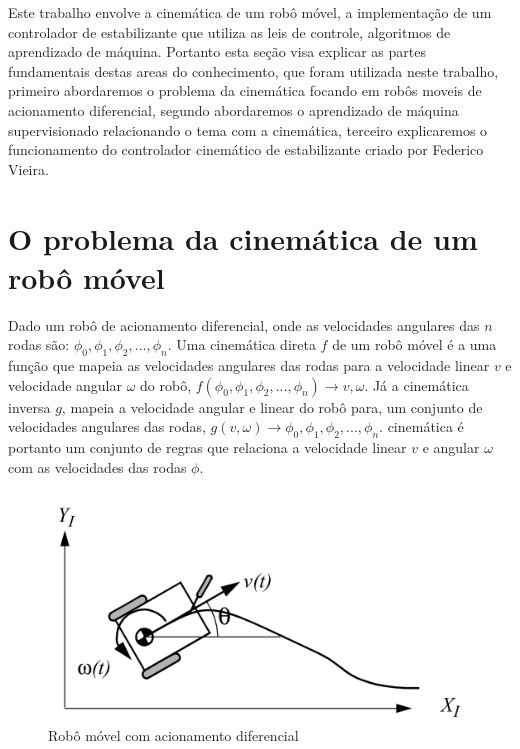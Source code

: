 
\label{Cap:Teoria}
Este trabalho envolve a cinemática de um robô móvel,
a implementação de um controlador de estabilizante
que utiliza as leis de controle,
algoritmos de aprendizado de máquina. Portanto esta seção
visa explicar as partes fundamentais destas areas do conhecimento,
que foram utilizada neste trabalho, primeiro abordaremos o problema
da cinemática focando em robôs moveis de acionamento diferencial,
segundo abordaremos o aprendizado de máquina supervisionado
relacionando o tema com a cinemática, terceiro explicaremos o
funcionamento do controlador cinemático de estabilizante criado
por Federico Vieira.

\section{O problema da cinemática de um robô móvel}
Dado um robô de acionamento diferencial, onde as velocidades
angulares das $n$ rodas são: $\phi_0,\phi_1,\phi_2,...,\phi_n$.
Uma cinemática direta $f$ de um robô móvel é a uma função que mapeia as
velocidades
angulares das rodas para a velocidade linear $v$ e velocidade angular $\omega$
do robô, $f(\phi_0,\phi_1,\phi_2,...,\phi_n) \rightarrow v,\omega$. Já
a cinemática inversa $g$, mapeia a velocidade angular e linear do robô para, um
conjunto de velocidades angulares das rodas, $g(v,\omega) \rightarrow  \phi_0,\phi_1,\phi_2,...,\phi_n$.
cinemática é portanto um conjunto de regras que relaciona a velocidade
linear $v$ e angular $\omega$
com as velocidades das rodas $\phi$.

\begin{figure}[H]
    \label{fig:robo:movel:acionamento:diferencial}
    \centering
    \includegraphics[scale=0.9]{figuras/robo.png}
    \caption{Robô móvel com acionamento diferencial}
\end{figure}

